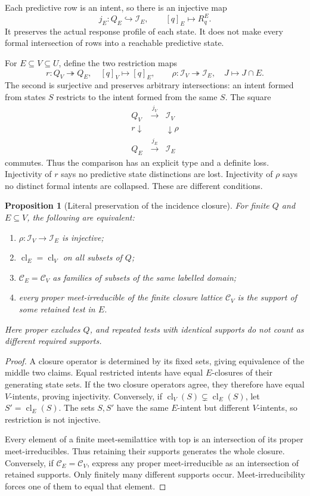 \documentclass[11pt]{article}
\newtheorem{proposition}[theorem]{Proposition}
\theoremstyle{remark}
\newcommand{\cl}{\operatorname{cl}}
\newcommand{\C}{\mathcal C}
\newcommand{\I}{\mathcal I}
\begin{document}
Each predictive row is an intent, so there is an injective map
\[
 j_E:Q_E\hookrightarrow\I_E,\qquad [q]_E\mapsto R_q^E.
\]
It preserves the actual response profile of each state. It does not make every formal intersection of rows into a reachable predictive state.

For $E\subseteq V\subseteq U$, define the two restriction maps
\[
 r:Q_V\twoheadrightarrow Q_E,\quad[q]_V\mapsto[q]_E,
 \qquad
 \rho:\I_V\twoheadrightarrow\I_E,\quad J\mapsto J\cap E.
\]
The second is surjective and preserves arbitrary intersections: an intent formed from states $S$ restricts to the intent formed from the same $S$. The square
\[
 \begin{array}{ccc}
 Q_V&\xrightarrow{j_V}&\I_V\\
 {\scriptstyle r}\downarrow&&\downarrow{\scriptstyle\rho}\\
 Q_E&\xrightarrow{j_E}&\I_E
 \end{array}
\]
commutes. Thus the comparison has an explicit type and a definite loss. Injectivity of $r$ says no predictive state distinctions are lost. Injectivity of $\rho$ says no distinct formal intents are collapsed. These are different conditions.

\begin{proposition}[Literal preservation of the incidence closure]
\label{prop:restriction}
For finite $Q$ and $E\subseteq V$, the following are equivalent:
\begin{enumerate}
\item $\rho:\I_V\to\I_E$ is injective;
\item $\cl_E=\cl_V$ on all subsets of $Q$;
\item $\C_E=\C_V$ as families of subsets of the same labelled domain;
\item every proper meet-irreducible of the finite closure lattice $\C_V$ is the support of some retained test in $E$.
\end{enumerate}
Here proper excludes $Q$, and repeated tests with identical supports do not count as different required supports.
\end{proposition}
\begin{proof}
A closure operator is determined by its fixed sets, giving equivalence of the middle two claims. Equal restricted intents have equal $E$-closures of their generating state sets. If the two closure operators agree, they therefore have equal $V$-intents, proving injectivity. Conversely, if $\cl_V(S)\subsetneq\cl_E(S)$, let $S'=\cl_E(S)$. The sets $S,S'$ have the same $E$-intent but different $V$-intents, so restriction is not injective.

Every element of a finite meet-semilattice with top is an intersection of its proper meet-irreducibles. Thus retaining their supports generates the whole closure. Conversely, if $\C_E=\C_V$, express any proper meet-irreducible as an intersection of retained supports. Only finitely many different supports occur. Meet-irreducibility forces one of them to equal that element.
\end{proof}
\end{document}
